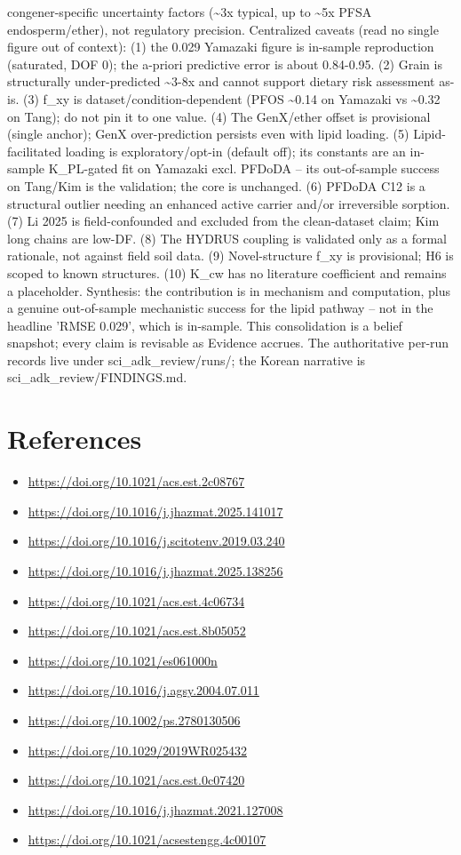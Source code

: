 \documentclass{article}
\begin{document}
congener-specific uncertainty factors (\textasciitilde{}3x typical, up to \textasciitilde{}5x PFSA endosperm/ether), not regulatory precision. Centralized caveats (read no single figure out of context): (1) the 0.029 Yamazaki figure is in-sample reproduction (saturated, DOF 0); the a-priori predictive error is about 0.84-0.95. (2) Grain is structurally under-predicted \textasciitilde{}3-8x and cannot support dietary risk assessment as-is. (3) f\_xy is dataset/condition-dependent (PFOS \textasciitilde{}0.14 on Yamazaki vs \textasciitilde{}0.32 on Tang); do not pin it to one value. (4) The GenX/ether offset is provisional (single anchor); GenX over-prediction persists even with lipid loading. (5) Lipid-facilitated loading is exploratory/opt-in (default off); its constants are an in-sample K\_PL-gated fit on Yamazaki excl. PFDoDA -- its out-of-sample success on Tang/Kim is the validation; the core is unchanged. (6) PFDoDA C12 is a structural outlier needing an enhanced active carrier and/or irreversible sorption. (7) Li 2025 is field-confounded and excluded from the clean-dataset claim; Kim long chains are low-DF. (8) The HYDRUS coupling is validated only as a formal rationale, not against field soil data. (9) Novel-structure f\_xy is provisional; H6 is scoped to known structures. (10) K\_cw has no literature coefficient and remains a placeholder. Synthesis: the contribution is in mechanism and computation, plus a genuine out-of-sample mechanistic success for the lipid pathway -- not in the headline 'RMSE 0.029', which is in-sample. This consolidation is a belief snapshot; every claim is revisable as Evidence accrues. The authoritative per-run records live under sci\_adk\_review/runs/; the Korean narrative is sci\_adk\_review/FINDINGS.md.

\section{References}
\begin{itemize}
  \item \url{https://doi.org/10.1021/acs.est.2c08767}
  \item \url{https://doi.org/10.1016/j.jhazmat.2025.141017}
  \item \url{https://doi.org/10.1016/j.scitotenv.2019.03.240}
  \item \url{https://doi.org/10.1016/j.jhazmat.2025.138256}
  \item \url{https://doi.org/10.1021/acs.est.4c06734}
  \item \url{https://doi.org/10.1021/acs.est.8b05052}
  \item \url{https://doi.org/10.1021/es061000n}
  \item \url{https://doi.org/10.1016/j.agsy.2004.07.011}
  \item \url{https://doi.org/10.1002/ps.2780130506}
  \item \url{https://doi.org/10.1029/2019WR025432}
  \item \url{https://doi.org/10.1021/acs.est.0c07420}
  \item \url{https://doi.org/10.1016/j.jhazmat.2021.127008}
  \item \url{https://doi.org/10.1021/acsestengg.4c00107}
\end{itemize}



\nocite{*}
\end{document}
